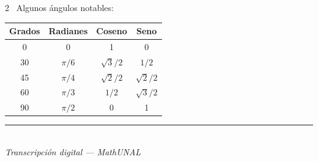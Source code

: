 \documentclass[11pt]{article}
\newcommand{\examfooter}{%
  \vfill
  \rule{\linewidth}{0.4pt}\\[1pt]
  {\scriptsize\textit{Transcripción digital --- MathUNAL}\hfill\textcolor{unalblue}{\textbf{\thepage}}}
}
\begin{document}
\begin{multicols}{2}
\textbullet\ Algunos ángulos notables:

\begin{center}
\begin{tabular}{|c|c|c|c|}
\hline
Grados & Radianes & Coseno & Seno \\
\hline
0 & 0 & 1 & 0 \\
30 & $\pi/6$ & $\sqrt{3}/2$ & $1/2$ \\
45 & $\pi/4$ & $\sqrt{2}/2$ & $\sqrt{2}/2$ \\
60 & $\pi/3$ & $1/2$ & $\sqrt{3}/2$ \\
90 & $\pi/2$ & 0 & 1 \\
\hline
\end{tabular}
\end{center}

\end{multicols}

\examfooter
\end{document}
